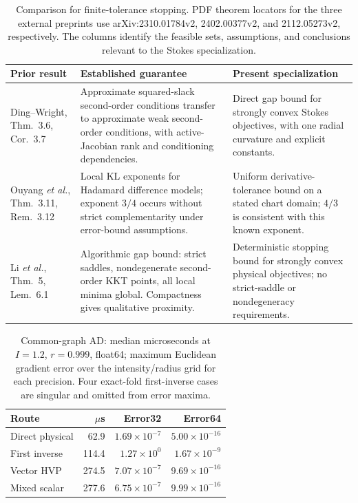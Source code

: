 \begin{table}[H]
\caption{Comparison for finite-tolerance stopping. PDF theorem locators for the three external preprints use arXiv:2310.01784v2, 2402.00377v2, and 2112.05273v2, respectively. The columns identify the feasible sets, assumptions, and conclusions relevant to the Stokes specialization.}
\label{SI-tab:stoppingprior}
\centering\small\renewcommand{\arraystretch}{1.12}
\begin{tabularx}{\textwidth}{@{}p{}p{}X@{}}\toprule
Prior result & Established guarantee & Present specialization\\\midrule
Ding--Wright, Thm.~3.6, Cor.~3.7 \cite{supp-dingwright} & Approximate squared-slack second-order conditions transfer to approximate weak second-order conditions, with active-Jacobian rank and conditioning dependencies. & Direct gap bound for strongly convex Stokes objectives, with one radial curvature and explicit constants.\\
Ouyang \emph{et al.}, Thm.~3.11, Rem.~3.12 \cite{supp-ouyang} & Local KL exponents for Hadamard difference models; exponent $3/4$ occurs without strict complementarity under error-bound assumptions. & Uniform derivative-tolerance bound on a stated chart domain; $4/3$ is consistent with this known exponent.\\
Li \emph{et al.}, Thm.~5, Lem.~6.1 \cite{supp-hadamard} & Algorithmic gap bound: strict saddles, nondegenerate second-order KKT points, all local minima global. Compactness gives qualitative proximity. & Deterministic stopping bound for strongly convex physical objectives; no strict-saddle or nondegeneracy requirements.\\\bottomrule
\end{tabularx}
\end{table}

\begin{table}[H]
\caption{Common-graph AD: median microseconds at $I=1.2$, $r=0.999$, float64; maximum Euclidean gradient error over the intensity/radius grid for each precision. Four exact-fold first-inverse cases are singular and omitted from error maxima.}
\label{SI-tab:adcost}
\centering\small
\begin{tabular}{@{}lrrr@{}}\toprule
Route & $\mu$s & Error32 & Error64\\\midrule
Direct physical & 62.9 & $1.69\!\times\!10^{-7}$ & $5.00\!\times\!10^{-16}$\\
First inverse & 114.4 & $1.27\!\times\!10^{0}$ & $1.67\!\times\!10^{-9}$\\
Vector HVP & 274.5 & $7.07\!\times\!10^{-7}$ & $9.69\!\times\!10^{-16}$\\
Mixed scalar & 277.6 & $6.75\!\times\!10^{-7}$ & $9.99\!\times\!10^{-16}$\\
\bottomrule
\end{tabular}
\end{table}

